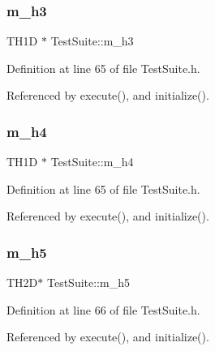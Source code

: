 \subsubsection{\texorpdfstring{m\+\_\+h3}{m\_h3}}
{\footnotesize\ttfamily T\+H1D $\ast$ Test\+Suite\+::m\+\_\+h3\hspace{0.3cm}{\ttfamily [private]}}



Definition at line 65 of file Test\+Suite.\+h.



Referenced by execute(), and initialize().

\mbox{\label{classTestSuite_a86739625b47a8ce6ebe2d7fb9f5128e3}} 
\subsubsection{\texorpdfstring{m\+\_\+h4}{m\_h4}}
{\footnotesize\ttfamily T\+H1D $\ast$ Test\+Suite\+::m\+\_\+h4\hspace{0.3cm}{\ttfamily [private]}}



Definition at line 65 of file Test\+Suite.\+h.



Referenced by execute(), and initialize().

\mbox{\label{classTestSuite_a384f4680f040072ec87b872bb4778ed6}} 
\subsubsection{\texorpdfstring{m\+\_\+h5}{m\_h5}}
{\footnotesize\ttfamily T\+H2D$\ast$ Test\+Suite\+::m\+\_\+h5\hspace{0.3cm}{\ttfamily [private]}}



Definition at line 66 of file Test\+Suite.\+h.



Referenced by execute(), and initialize().

\mbox{\label{classTestSuite_a853a92fd3e82371d19993739c2bf1236}} 
